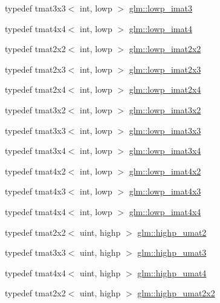 \begin{DoxyCompactItemize}
\item 
typedef tmat3x3$<$ int, lowp $>$ \hyperlink{group__gtc__matrix__integer_ga2f7d17630aa9e27bb9e62f98603a4d7e}{glm\-::lowp\-\_\-imat3}
\item 
typedef tmat4x4$<$ int, lowp $>$ \hyperlink{group__gtc__matrix__integer_gad9a60f2ee78750d31b129c01096751b6}{glm\-::lowp\-\_\-imat4}
\item 
typedef tmat2x2$<$ int, lowp $>$ \hyperlink{group__gtc__matrix__integer_gad1950bd75bc033e8511cec3deb15af56}{glm\-::lowp\-\_\-imat2x2}
\item 
typedef tmat2x3$<$ int, lowp $>$ \hyperlink{group__gtc__matrix__integer_ga00e00501dd9bf929e1dca7a167ba526b}{glm\-::lowp\-\_\-imat2x3}
\item 
typedef tmat2x4$<$ int, lowp $>$ \hyperlink{group__gtc__matrix__integer_gaf664d339f1b66e62ed07c913e60be940}{glm\-::lowp\-\_\-imat2x4}
\item 
typedef tmat3x2$<$ int, lowp $>$ \hyperlink{group__gtc__matrix__integer_ga93514d2df726334e6d5edd373635d343}{glm\-::lowp\-\_\-imat3x2}
\item 
typedef tmat3x3$<$ int, lowp $>$ \hyperlink{group__gtc__matrix__integer_ga434abdeee9a8908660691be659f6693f}{glm\-::lowp\-\_\-imat3x3}
\item 
typedef tmat3x4$<$ int, lowp $>$ \hyperlink{group__gtc__matrix__integer_ga61fe3487c1f4f10fb0f5c9fa0873a694}{glm\-::lowp\-\_\-imat3x4}
\item 
typedef tmat4x2$<$ int, lowp $>$ \hyperlink{group__gtc__matrix__integer_ga87e2118b22cbc6916805aafcda52a943}{glm\-::lowp\-\_\-imat4x2}
\item 
typedef tmat4x3$<$ int, lowp $>$ \hyperlink{group__gtc__matrix__integer_ga76c201715b216ddd5d7de3c3759211f1}{glm\-::lowp\-\_\-imat4x3}
\item 
typedef tmat4x4$<$ int, lowp $>$ \hyperlink{group__gtc__matrix__integer_ga46f8dc46c3dcde8fa2e8b8f645c0d9ef}{glm\-::lowp\-\_\-imat4x4}
\item 
typedef tmat2x2$<$ uint, highp $>$ \hyperlink{group__gtc__matrix__integer_ga113fe97aa8688eaa287a02f8362f3e47}{glm\-::highp\-\_\-umat2}
\item 
typedef tmat3x3$<$ uint, highp $>$ \hyperlink{group__gtc__matrix__integer_ga58bc8d0aeac88af0d38723b5cfa4fa67}{glm\-::highp\-\_\-umat3}
\item 
typedef tmat4x4$<$ uint, highp $>$ \hyperlink{group__gtc__matrix__integer_ga7b0e78c54432c7236d8b96473b7423ec}{glm\-::highp\-\_\-umat4}
\item 
typedef tmat2x2$<$ uint, highp $>$ \hyperlink{group__gtc__matrix__integer_gaeb546847abfc7c3c09ea8172987ebb16}{glm\-::highp\-\_\-umat2x2}

\end{DoxyCompactItemize}
